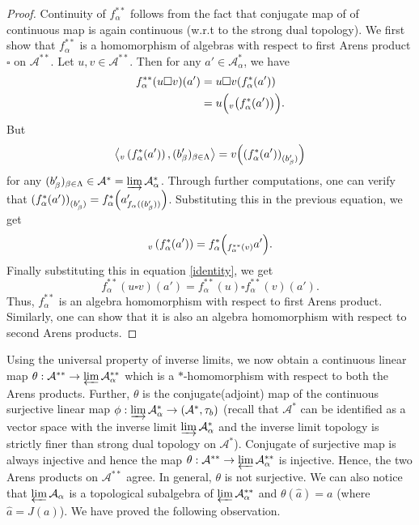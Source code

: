 \documentclass[10pt]{article}
\theoremstyle{definition}
\begin{document}
	\begin{proof}
		Continuity of $f_\alpha^{**}$ follows from the fact that conjugate map of of continuous map is again continuous (w.r.t to the strong dual topology). We first show that $f_\alpha^{**}$ is a homomorphism of algebras with respect to first Arens product $\square$ on $\mathcal A^{**}$. Let $u,v\in \mathcal A^{**}$. Then for any $a'\in \mathcal A^*_\alpha$, we have\begin{align}\label{identity}
			f_\alpha^{**}(u\square v)(a')&=u\square v(f_\alpha^*(a'))\nonumber\\&=u\Bigl({}_v\bigl(f_\alpha^*(a')\bigr)\Bigr).
		\end{align}
		But \begin{equation}\left<{}_v\left(f_\alpha^*(a')\right),(b'_\beta)_{\beta\in \Lambda}\right>=v\Bigl(\left(f_\alpha^*(a')\right)_{(b_\beta')}\Bigr)\end{equation} for any $(b_\beta')_{\beta\in \Lambda}\in \mathcal A^*=\varinjlim\mathcal A_\alpha^*$. Through further computations, one can verify that $\left(f_\alpha^*(a')\right)_{(b_\beta')}=f_\alpha^*\Bigl(a'_{f_\alpha((b'_\beta))}\Bigr)$. Substituting this in the previous equation, we get \begin{equation}
{}_v\left(f_\alpha^*(a')\right)=f_\alpha^*\Bigl({}_{f_\alpha^{**}(v)}a'\Bigr).
		\end{equation}
		Finally substituting this in equation \ref{identity}, we get \begin{equation}
f_\alpha^{**}(u\square v)(a')=f_\alpha^{**}(u)\square f_\alpha^{**}(v)(a').
		\end{equation}
		Thus, $f_\alpha^{**}$ is an algebra homomorphism with respect to first Arens product. Similarly, one can show that it is also an algebra homomorphism with respect to second Arens products.
	\end{proof}
\noindent	Using the universal property of inverse limits, we now obtain a continuous linear map $\theta:\mathcal A^{**}\to \varprojlim \mathcal A_\alpha^{**}$ which is a $*$-homomorphism with respect to both the Arens products. Further, $\theta$ is the conjugate(adjoint) map of the continuous surjective linear map $\phi:\varinjlim \mathcal A_\alpha^*\to (\mathcal A^*,\tau_b)$ (recall that $\mathcal A^*$ can be identified as a vector space with the inverse limit $\varinjlim\mathcal A_\alpha^*$ and the inverse limit topology is strictly finer than strong dual topology on $\mathcal A^*$). Conjugate of surjective map is always injective and hence the map $\theta:\mathcal A^{**}\to \varprojlim \mathcal A_\alpha^{**}$ is injective. Hence, the two Arens products on $\mathcal A^{**}$ agree. In general, $\theta$ is not surjective. We can also notice that $\varprojlim\mathcal A_\alpha$ is a topological subalgebra of $\varprojlim\mathcal A_{\alpha}^{**}$ and $\theta (\hat a)=a$ (where $\hat a=J(a)$). We have proved the  following observation.
\end{document}
